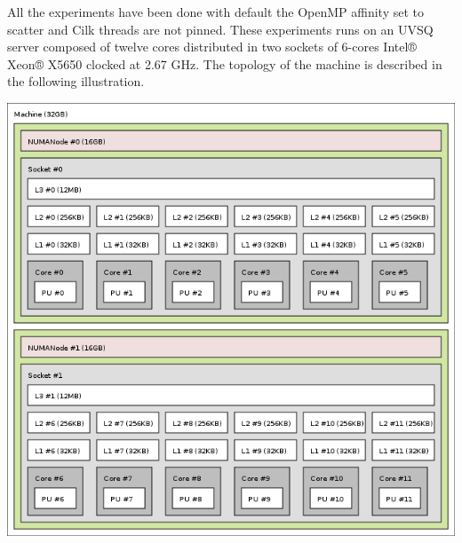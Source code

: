 \documentclass{IOS-Book-Article}
\begin{document}
All the experiments have been done with default the OpenMP affinity set to scatter and Cilk threads are not pinned. These experiments runs on an UVSQ server
composed of twelve cores distributed in two sockets of 6-cores Intel® Xeon® X5650 clocked at 2.67 GHz. The topology of the machine is described in the following illustration.
\begin{center}
 \includegraphics[scale=0.4]{topo_mauduit.png}
\end{center}
\end{document}
